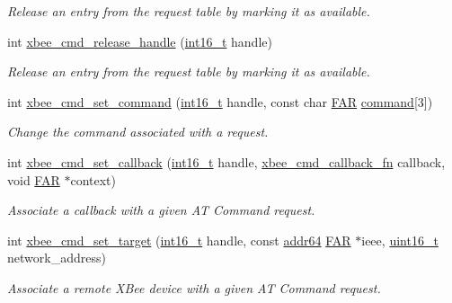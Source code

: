 \begin{DoxyCompactItemize}
\begin{DoxyCompactList}\small\item\em Release an entry from the request table by marking it as available. \end{DoxyCompactList}\item 
int \hyperlink{group__xbee__atcmd_ga91641619ae34da34615193962ffd1525}{xbee\+\_\+cmd\+\_\+release\+\_\+handle} (\hyperlink{group__hal__dos_ga2140805d08462d474b82ddc8d1c2f3e6}{int16\+\_\+t} handle)
\begin{DoxyCompactList}\small\item\em Release an entry from the request table by marking it as available. \end{DoxyCompactList}\item 
int \hyperlink{group__xbee__atcmd_ga06181e54a87d90c30108360d6b433323}{xbee\+\_\+cmd\+\_\+set\+\_\+command} (\hyperlink{group__hal__dos_ga2140805d08462d474b82ddc8d1c2f3e6}{int16\+\_\+t} handle, const char \hyperlink{group__hal_gaef060b3456fdcc093a7210a762d5f2ed}{F\+AR} \hyperlink{group__xbee__atcmd_ga1a5aaa930940857f68f245eeb89506b5}{command}\mbox{[}3\mbox{]})
\begin{DoxyCompactList}\small\item\em Change the command associated with a request. \end{DoxyCompactList}\item 
int \hyperlink{group__xbee__atcmd_ga0a5d2e2e87743061c46abd53e379e014}{xbee\+\_\+cmd\+\_\+set\+\_\+callback} (\hyperlink{group__hal__dos_ga2140805d08462d474b82ddc8d1c2f3e6}{int16\+\_\+t} handle, \hyperlink{group__xbee__atcmd_ga113cbd0a40a638710974218de5f885fe}{xbee\+\_\+cmd\+\_\+callback\+\_\+fn} callback, void \hyperlink{group__hal_gaef060b3456fdcc093a7210a762d5f2ed}{F\+AR} $\ast$context)
\begin{DoxyCompactList}\small\item\em Associate a callback with a given AT Command request. \end{DoxyCompactList}\item 
int \hyperlink{group__xbee__atcmd_gae478cb2ea9bb07ade86009a65e6d121f}{xbee\+\_\+cmd\+\_\+set\+\_\+target} (\hyperlink{group__hal__dos_ga2140805d08462d474b82ddc8d1c2f3e6}{int16\+\_\+t} handle, const \hyperlink{unionaddr64}{addr64} \hyperlink{group__hal_gaef060b3456fdcc093a7210a762d5f2ed}{F\+AR} $\ast$ieee, \hyperlink{group__hal__dos_ga5a8b2dc9e45a9ee81a94ef304fb62505}{uint16\+\_\+t} network\+\_\+address)
\begin{DoxyCompactList}\small\item\em Associate a remote X\+Bee device with a given AT Command request. \end{DoxyCompactList}\item 

\end{DoxyCompactItemize}

